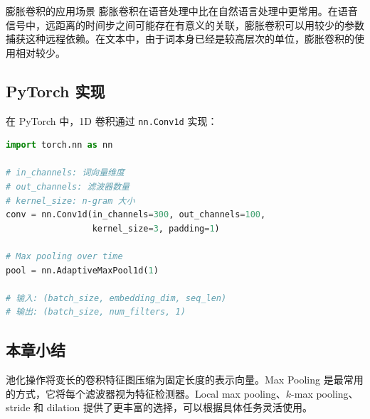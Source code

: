 \begin{knowledgebox}{膨胀卷积的应用场景}
膨胀卷积在语音处理中比在自然语言处理中更常用。在语音信号中，远距离的时间步之间可能存在有意义的关联，膨胀卷积可以用较少的参数捕获这种远程依赖。在文本中，由于词本身已经是较高层次的单位，膨胀卷积的使用相对较少。
\end{knowledgebox}

\subsection{PyTorch 实现}

在 PyTorch 中，1D 卷积通过 \texttt{nn.Conv1d} 实现：

\begin{lstlisting}[caption={PyTorch 中 1D 卷积的基本用法},language=Python]
import torch.nn as nn

# in_channels: 词向量维度
# out_channels: 滤波器数量
# kernel_size: n-gram 大小
conv = nn.Conv1d(in_channels=300, out_channels=100,
                 kernel_size=3, padding=1)

# Max pooling over time
pool = nn.AdaptiveMaxPool1d(1)

# 输入: (batch_size, embedding_dim, seq_len)
# 输出: (batch_size, num_filters, 1)
\end{lstlisting}

\subsection{本章小结}

池化操作将变长的卷积特征图压缩为固定长度的表示向量。Max Pooling 是最常用的方式，它将每个滤波器视为特征检测器。Local max pooling、$k$-max pooling、stride 和 dilation 提供了更丰富的选择，可以根据具体任务灵活使用。


